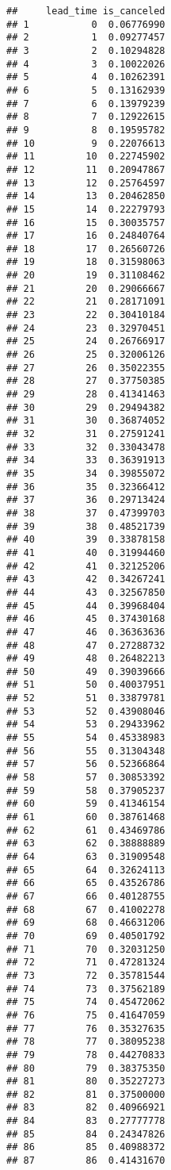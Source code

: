 \documentclass[
]{article}
\begin{document}
\begin{verbatim}
##     lead_time is_canceled
## 1           0  0.06776990
## 2           1  0.09277457
## 3           2  0.10294828
## 4           3  0.10022026
## 5           4  0.10262391
## 6           5  0.13162939
## 7           6  0.13979239
## 8           7  0.12922615
## 9           8  0.19595782
## 10          9  0.22076613
## 11         10  0.22745902
## 12         11  0.20947867
## 13         12  0.25764597
## 14         13  0.20462850
## 15         14  0.22279793
## 16         15  0.30035757
## 17         16  0.24840764
## 18         17  0.26560726
## 19         18  0.31598063
## 20         19  0.31108462
## 21         20  0.29066667
## 22         21  0.28171091
## 23         22  0.30410184
## 24         23  0.32970451
## 25         24  0.26766917
## 26         25  0.32006126
## 27         26  0.35022355
## 28         27  0.37750385
## 29         28  0.41341463
## 30         29  0.29494382
## 31         30  0.36874052
## 32         31  0.27591241
## 33         32  0.33043478
## 34         33  0.36391913
## 35         34  0.39855072
## 36         35  0.32366412
## 37         36  0.29713424
## 38         37  0.47399703
## 39         38  0.48521739
## 40         39  0.33878158
## 41         40  0.31994460
## 42         41  0.32125206
## 43         42  0.34267241
## 44         43  0.32567850
## 45         44  0.39968404
## 46         45  0.37430168
## 47         46  0.36363636
## 48         47  0.27288732
## 49         48  0.26482213
## 50         49  0.39039666
## 51         50  0.40037951
## 52         51  0.33879781
## 53         52  0.43908046
## 54         53  0.29433962
## 55         54  0.45338983
## 56         55  0.31304348
## 57         56  0.52366864
## 58         57  0.30853392
## 59         58  0.37905237
## 60         59  0.41346154
## 61         60  0.38761468
## 62         61  0.43469786
## 63         62  0.38888889
## 64         63  0.31909548
## 65         64  0.32624113
## 66         65  0.43526786
## 67         66  0.40128755
## 68         67  0.41002278
## 69         68  0.46631206
## 70         69  0.40501792
## 71         70  0.32031250
## 72         71  0.47281324
## 73         72  0.35781544
## 74         73  0.37562189
## 75         74  0.45472062
## 76         75  0.41647059
## 77         76  0.35327635
## 78         77  0.38095238
## 79         78  0.44270833
## 80         79  0.38375350
## 81         80  0.35227273
## 82         81  0.37500000
## 83         82  0.40966921
## 84         83  0.27777778
## 85         84  0.24347826
## 86         85  0.40988372
## 87         86  0.41431670

\end{verbatim}
\end{document}
